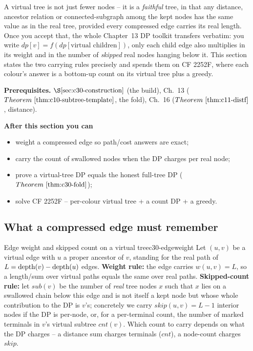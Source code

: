 \begin{topicintro}
A virtual tree is not just fewer nodes -- it is a \emph{faithful} tree, in that any
distance, ancestor relation or connected-subgraph among the kept nodes has the same
value as in the real tree, provided every compressed edge carries its real length.
Once you accept that, the whole Chapter~13 DP toolkit transfers verbatim: you write
\(\mathit{dp}[v]=f(\mathit{dp}[\text{virtual children}])\), only each child edge also
multiplies in its weight and in the number of \emph{skipped} real nodes hanging below
it.  This section states the two carrying rules precisely and spends them on CF 2252F,
where each colour's answer is a bottom-up count on its virtual tree plus a greedy.

\textbf{Prerequisites.} \(\secref{c30-construction}\) (the build), Ch.~13
(\(\thmref{c10-subtree-template}\), the fold), Ch.~16 (\(\thmref{c11-distf}\),
distance).

\textbf{After this section you can}
\begin{itemize}[nosep]
  \item weight a compressed edge so path/cost answers are exact; \hfill{}
  \item carry the count of swallowed nodes when the DP charges per real node; \hfill{}
  \item prove a virtual-tree DP equals the honest full-tree DP (\(\thmref{c30-fold}\)); \hfill{}
  \item solve CF 2252F -- per-colour virtual tree + a count DP + a greedy. \hfill{}
\end{itemize}
\end{topicintro}

\subsection{What a compressed edge must remember}

\begin{definition}{Edge weight and skipped count on a virtual tree}{c30-edgeweight}
Let \((u,v)\) be a virtual edge with \(u\) a proper ancestor of \(v\), standing for
the real path of \(L=\operatorname{depth}(v)-\operatorname{depth}(u)\) edges.  \textbf{Weight rule:} the edge
carries \(w(u,v)=L\), so a length/sum over virtual paths equals the same over
real paths.  \textbf{Skipped-count rule:} let \(\mathit{sub}(v)\) be the number of
\emph{real} tree nodes \(x\) such that \(x\) lies on a swallowed chain below this
edge and is not itself a kept node but whose whole contribution to the DP is
\(v\)'s; concretely we carry \(\mathit{skip}(u,v)=L-1\) interior nodes if the DP is
per-node, or, for a per-terminal count, the number of marked terminals in \(v\)'s
virtual subtree \(\mathit{cnt}(v)\).  Which count to carry depends on what the DP
charges -- a distance sum charges terminals (\(\mathit{cnt}\)), a node-count
charges \(\mathit{skip}\).
\end{definition}

